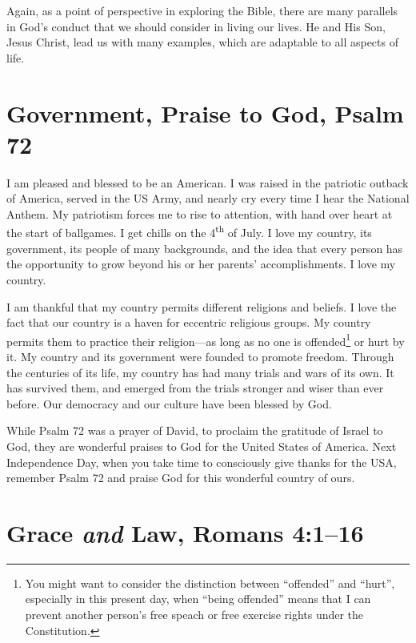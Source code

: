 \documentclass[12pt]{memoir}
\begin{document}
Again, as a point of perspective in exploring the Bible, there are
many parallels in God's conduct that we should consider in living
our lives.
He and His Son, Jesus Christ, lead us with many examples,
which are adaptable to all aspects of life. 


\section[Government, Praise to God]{Government, Praise to God, Psalm 72}

I am pleased and blessed to be an American. I was raised in the patriotic
outback of America, served in the US Army, and nearly cry every
time I hear the National Anthem. My patriotism forces me to rise to
attention, with hand over heart at the start of ballgames. I get chills
on the 4\textsuperscript{th} of July. I love my country, its government,
its people of many backgrounds, and the idea that every person has
the opportunity to grow beyond his or her parents' accomplishments.
I love my country.

I am thankful that my country permits different religions and beliefs.
I love the fact that our country is a haven for eccentric religious
groups. My country permits them to practice their religion---as long
as no one is offended\footnote{You might want to consider the distinction between ``offended'' and ``hurt'', especially in this present day, when ``being offended'' means that I can prevent another person's free speach or free exercise rights under the Constitution.} or hurt by it. My country and its government
were founded to promote freedom. Through the centuries of its
life, my country has had many trials and wars of its own. It has survived
them, and emerged from the trials stronger and wiser than ever before.
Our democracy and our culture have been blessed by God. 

While Psalm 72 was a prayer of David, to proclaim the gratitude of
Israel to God, they are wonderful praises to God for the United States
of America. Next Independence Day, when you take time to consciously
give thanks for the USA, remember Psalm 72 and praise God for this
wonderful country of ours.


\section[Grace \emph{and} Law]{Grace \emph{and} Law, Romans 4:1--16}
\label{chap2:law_and_grace}
\end{document}
